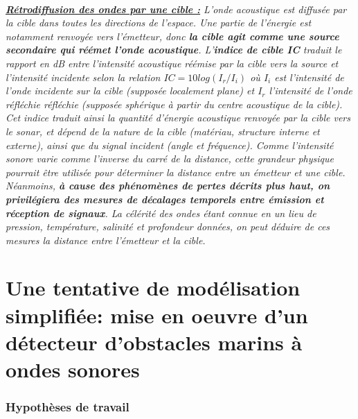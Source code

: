 \documentclass[a4paper,11pt]{article}
\begin{document}
\paragraph{\normalfont \textbf{\underline{R\'{e}trodiffusion des ondes par une cible :}}\newline
L'onde acoustique est diffus\'{e}e par la cible dans toutes les directions de l'espace. Une partie de l'\'{e}nergie est notamment renvoy\'{e}e vers l'\'{e}metteur, donc \textbf{la cible agit comme une source secondaire qui r\'{e}\'{e}met l'onde acoustique}. L'\textbf{indice de cible IC} traduit le rapport en dB entre l'intensit\'{e} acoustique r\'{e}\'{e}mise par la cible vers la source et l'intensit\'{e} incidente selon la relation $IC=10log(I_r/I_i)$ o\`{u} $I_i$ est l'intensit\'{e} de l'onde incidente sur la cible (suppos\'{e}e localement plane) et $I_r$ l'intensit\'{e} de l'onde r\'{e}fl\'{e}chie r\'{e}fl\'{e}chie (suppos\'{e}e sph\'{e}rique \`{a} partir du centre acoustique de la cible). Cet indice traduit ainsi la quantit\'{e} d'\'{e}nergie acoustique renvoy\'{e}e par la cible vers le sonar, et d\'{e}pend de la nature de la cible (mat\'{e}riau, structure interne et externe), ainsi que du signal incident (angle et fr\'{e}quence). \newline \newline
Comme l'intensit\'{e} sonore varie comme l'inverse du carr\'{e} de la distance, cette grandeur physique pourrait \^{e}tre utilis\'{e}e pour d\'{e}terminer la distance entre un \'{e}metteur et une cible. N\'{e}anmoins, \textbf{\`{a} cause des ph\'{e}nom\`{e}nes de pertes d\'{e}crits plus haut, on privil\'{e}giera des mesures de d\'{e}calages temporels entre \'{e}mission et r\'{e}ception de signaux}. La c\'{e}l\'{e}rit\'{e} des ondes \'{e}tant connue en un lieu de pression, temp\'{e}rature, salinit\'{e} et profondeur donn\'{e}es, on peut d\'{e}duire de ces mesures la distance entre l'\'{e}metteur et la cible.} \newpage
\part{Une tentative de mod\'{e}lisation simplifi\'{e}e: mise en oeuvre d'un d\'{e}tecteur d'obstacles marins \`{a} ondes sonores}
\setcounter{section}{0}
\section{Hypoth\`{e}ses de travail}
\end{document}
